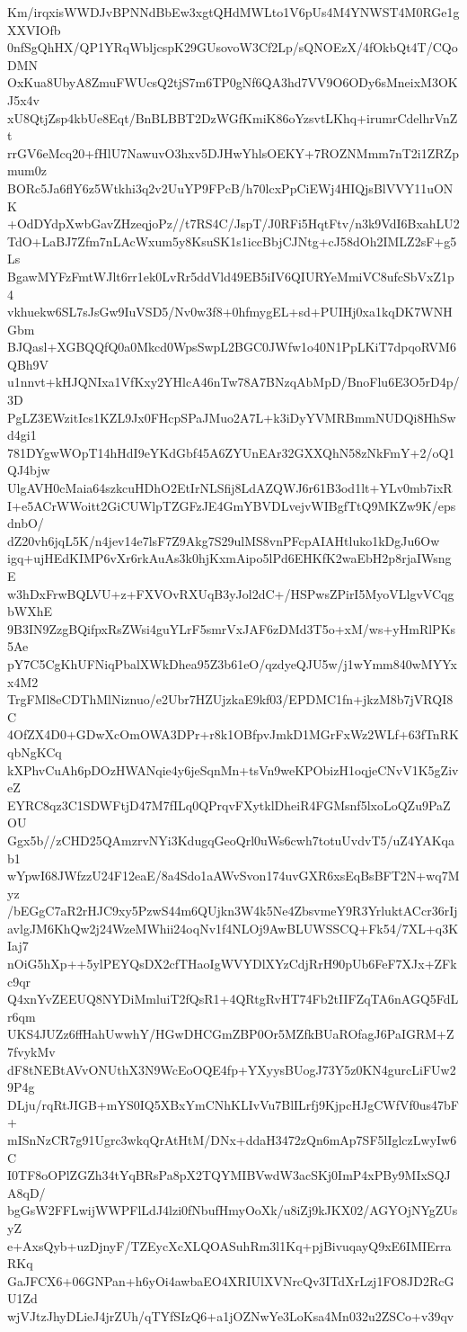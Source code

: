 Km/irqxisWWDJvBPNNdBbEw3xgtQHdMWLto1V6pUs4M4YNWST4M0RGe1gXXVIOfb
0nfSgQhHX/QP1YRqWbljcspK29GUsovoW3Cf2Lp/sQNOEzX/4fOkbQt4T/CQoDMN
OxKua8UbyA8ZmuFWUcsQ2tjS7m6TP0gNf6QA3hd7VV9O6ODy6sMneixM3OKJ5x4v
xU8QtjZsp4kbUe8Eqt/BnBLBBT2DzWGfKmiK86oYzsvtLKhq+irumrCdelhrVnZt
rrGV6eMcq20+fHlU7NawuvO3hxv5DJHwYhlsOEKY+7ROZNMmm7nT2i1ZRZpmum0z
BORc5Ja6flY6z5Wtkhi3q2v2UuYP9FPcB/h70lcxPpCiEWj4HIQjsBlVVY11uONK
+OdDYdpXwbGavZHzeqjoPz//t7RS4C/JspT/J0RFi5HqtFtv/n3k9VdI6BxahLU2
TdO+LaBJ7Zfm7nLAcWxum5y8KsuSK1s1iccBbjCJNtg+cJ58dOh2IMLZ2sF+g5Ls
BgawMYFzFmtWJlt6rr1ek0LvRr5ddVld49EB5iIV6QIURYeMmiVC8ufcSbVxZ1p4
vkhuekw6SL7sJsGw9IuVSD5/Nv0w3f8+0hfmygEL+sd+PUIHj0xa1kqDK7WNHGbm
BJQasl+XGBQQfQ0a0Mkcd0WpsSwpL2BGC0JWfw1o40N1PpLKiT7dpqoRVM6QBh9V
u1nnvt+kHJQNIxa1VfKxy2YHlcA46nTw78A7BNzqAbMpD/BnoFlu6E3O5rD4p/3D
PgLZ3EWzitIcs1KZL9Jx0FHcpSPaJMuo2A7L+k3iDyYVMRBmmNUDQi8HhSwd4gi1
781DYgwWOpT14hHdI9eYKdGbf45A6ZYUnEAr32GXXQhN58zNkFmY+2/oQ1QJ4bjw
UlgAVH0cMaia64szkcuHDhO2EtIrNLSfij8LdAZQWJ6r61B3od1lt+YLv0mb7ixR
I+e5ACrWWoitt2GiCUWlpTZGFzJE4GmYBVDLvejvWIBgfTtQ9MKZw9K/epsdnbO/
dZ20vh6jqL5K/n4jev14e7lsF7Z9Akg7S29ulMS8vnPFcpAIAHtluko1kDgJu6Ow
igq+ujHEdKIMP6vXr6rkAuAs3k0hjKxmAipo5lPd6EHKfK2waEbH2p8rjaIWsngE
w3hDxFrwBQLVU+z+FXVOvRXUqB3yJol2dC+/HSPwsZPirI5MyoVLlgvVCqgbWXhE
9B3IN9ZzgBQifpxRsZWsi4guYLrF5smrVxJAF6zDMd3T5o+xM/ws+yHmRlPKs5Ae
pY7C5CgKhUFNiqPbalXWkDhea95Z3b61eO/qzdyeQJU5w/j1wYmm840wMYYxx4M2
TrgFMl8eCDThMlNiznuo/e2Ubr7HZUjzkaE9kf03/EPDMC1fn+jkzM8b7jVRQI8C
4OfZX4D0+GDwXcOmOWA3DPr+r8k1OBfpvJmkD1MGrFxWz2WLf+63fTnRKqbNgKCq
kXPhvCuAh6pDOzHWANqie4y6jeSqnMn+tsVn9weKPObizH1oqjeCNvV1K5gZiveZ
EYRC8qz3C1SDWFtjD47M7fILq0QPrqvFXytklDheiR4FGMsnf5lxoLoQZu9PaZOU
Ggx5b//zCHD25QAmzrvNYi3KdugqGeoQrl0uWs6cwh7totuUvdvT5/uZ4YAKqab1
wYpwI68JWfzzU24F12eaE/8a4Sdo1aAWvSvon174uvGXR6xsEqBsBFT2N+wq7Myz
/bEGgC7aR2rHJC9xy5PzwS44m6QUjkn3W4k5Ne4ZbsvmeY9R3YrluktACcr36rIj
avlgJM6KhQw2j24WzeMWhii24oqNv1f4NLOj9AwBLUWSSCQ+Fk54/7XL+q3KIaj7
nOiG5hXp++5ylPEYQsDX2cfTHaoIgWVYDlXYzCdjRrH90pUb6FeF7XJx+ZFkc9qr
Q4xnYvZEEUQ8NYDiMmluiT2fQsR1+4QRtgRvHT74Fb2tIIFZqTA6nAGQ5FdLr6qm
UKS4JUZz6ffHahUwwhY/HGwDHCGmZBP0Or5MZfkBUaROfagJ6PaIGRM+Z7fvykMv
dF8tNEBtAVvONUthX3N9WcEoOQE4fp+YXyysBUogJ73Y5z0KN4gurcLiFUw29P4g
DLju/rqRtJIGB+mYS0IQ5XBxYmCNhKLIvVu7BlILrfj9KjpcHJgCWfVf0us47bF+
mISnNzCR7g91Ugrc3wkqQrAtHtM/DNx+ddaH3472zQn6mAp7SF5lIglczLwyIw6C
I0TF8oOPlZGZh34tYqBRsPa8pX2TQYMIBVwdW3acSKj0ImP4xPBy9MIxSQJA8qD/
bgGsW2FFLwijWWPFlLdJ4lzi0fNbufHmyOoXk/u8iZj9kJKX02/AGYOjNYgZUsyZ
e+AxsQyb+uzDjnyF/TZEycXcXLQOASuhRm3l1Kq+pjBivuqayQ9xE6IMIErraRKq
GaJFCX6+06GNPan+h6yOi4awbaEO4XRIUlXVNrcQv3ITdXrLzj1FO8JD2RcGU1Zd
wjVJtzJhyDLieJ4jrZUh/qTYfSIzQ6+a1jOZNwYe3LoKsa4Mn032u2ZSCo+v39qv
